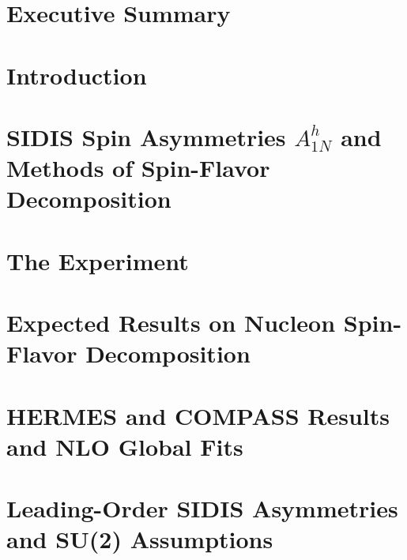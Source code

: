 \documentclass[11pt]{report}
\begin{document}
%
%

\setcounter{tocdepth}{4}
\tableofcontents

\chapter{Executive Summary}
\setcounter{page}{1}
 

%
\chapter{Introduction}


 
%
\chapter{SIDIS Spin Asymmetries $A_{1N}^h$ and Methods of Spin-Flavor Decomposition}

%
\chapter{The Experiment}
%
 
%
\chapter{Expected Results on Nucleon Spin-Flavor Decomposition}
 
%
%

\appendix

\chapter{HERMES and COMPASS Results and NLO Global Fits}
\label{hermes_compass}


\chapter{Leading-Order SIDIS Asymmetries  and SU(2) Assumptions }
\label{lo_asymmetry}
 
\end{document}
